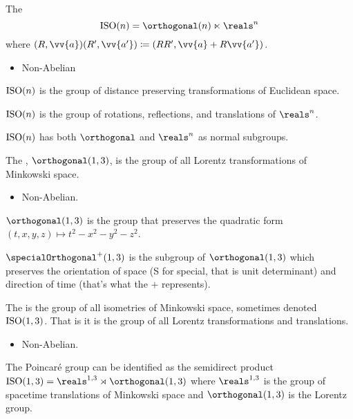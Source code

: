 \begin{dfn}{}{}
    The 
    \begin{equation}
        \ISO(n) = \orthogonal(n) \ltimes \reals^n
    \end{equation}
    where \((R, \vv{a}) (R', \vv{a'}) \coloneqq (RR', \vv{a} + R\vv{a'})\).
    \begin{multicols}{2}
        \begin{itemize}
            \item Non-Abelian
        \end{itemize}
    \end{multicols}
    \(\operatorname{ISO}(n)\) is the group of distance preserving transformations of Euclidean space.
    
    \(\operatorname{ISO}(n)\) is the group of rotations, reflections, and translations of \(\reals^n\).
    
    \(\operatorname{ISO}(n)\) has both \(\orthogonal\) and \(\reals^n\) as normal subgroups.
\end{dfn}

\begin{dfn}{}{}
    The , \(\orthogonal(1, 3)\), is the group of all Lorentz transformations of Minkowski space.
    \begin{multicols}{2}
        \begin{itemize}
            \item Non-Abelian.
        \end{itemize}
    \end{multicols}

    \(\orthogonal(1, 3)\) is the group that preserves the quadratic form \((t, x, y, z) \mapsto t^2 - x^2 - y^2 - z^2\).
    
    \(\specialOrthogonal^+(1, 3)\) is the subgroup of \(\orthogonal(1, 3)\) which preserves the orientation of space (S for special, that is unit determinant) and direction of time (that's what the \(+\) represents).
\end{dfn}

\begin{dfn}{}{}
    The  is the group of all isometries of Minkowski space, sometimes denoted \(\operatorname{ISO}(1, 3)\).
    That is it is the group of all Lorentz transformations and translations.
    \begin{multicols}{2}
        \begin{itemize}
            \item Non-Abelian.
        \end{itemize}
    \end{multicols}
    
    The Poincar\'e group can be identified as the semidirect product \(\isometry(1, 3) = \reals^{1,3} \rtimes  \orthogonal(1, 3)\) where \(\reals^{1,3}\) is the group of spacetime translations of Minkowski space and \(\orthogonal(1, 3)\) is the Lorentz group.
\end{dfn}
